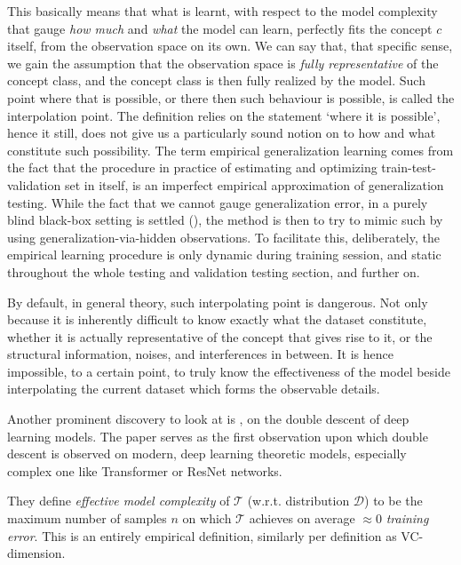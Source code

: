 \documentclass[
  journal=largetwo,
  year=2025,
  volume=37,
]{cup-journal}
\begin{document}
This basically means that what is learnt, with respect to the model complexity that gauge \textit{how much} and \textit{what} the model can learn, perfectly fits the concept $c$ itself, from the observation space on its own. We can say that, that specific sense, we gain the assumption that the observation space is \textit{fully representative} of the concept class, and the concept class is then fully realized by the model. Such point where that is possible, or there then such behaviour is possible, is called the interpolation point. The definition relies on the statement `where it is possible', hence it still, does not give us a particularly sound notion on to how and what constitute such possibility. The term empirical generalization learning comes from the fact that the procedure in practice of estimating and optimizing train-test-validation set in itself, is an imperfect empirical approximation of generalization testing. While the fact that we cannot gauge generalization error, in a purely blind black-box setting is settled (\cite{10.5555/2371238,10.5555/2930837,10.5555/2621980}), the method is then to try to mimic such by using generalization-via-hidden observations. To facilitate this, deliberately, the empirical learning procedure is only dynamic during training session, and static throughout the whole testing and validation testing section, and further on. 

By default, in general theory, such interpolating point is dangerous. Not only because it is inherently difficult to know exactly what the dataset constitute, whether it is actually representative of the concept that gives rise to it, or the structural information, noises, and interferences in between. It is hence impossible, to a certain point, to truly know the effectiveness of the model beside interpolating the current dataset which forms the observable details. 

Another prominent discovery to look at is \cite{nakkiran_deep_2019}, on the double descent of deep learning models. The paper serves as the first observation upon which double descent is observed on modern, deep learning theoretic models, especially complex one like Transformer or ResNet networks. 

They define \emph{effective model complexity} of $\mathcal{T}$ (w.r.t. distribution $\mathcal D$) to be the maximum number of samples $n$ on which $\mathcal{T}$ achieves on average $\approx 0$ \emph{training error}. This is an entirely empirical definition, similarly per definition as VC-dimension. 
\end{document}
